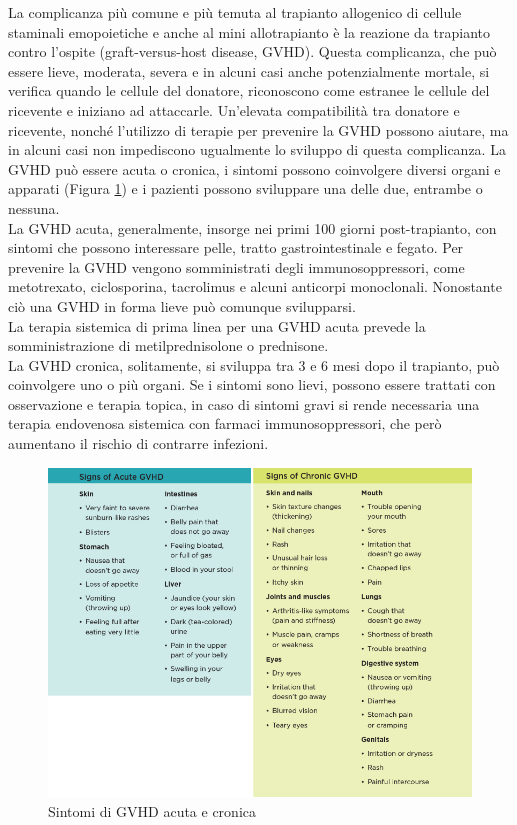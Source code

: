 La complicanza più comune e più temuta al trapianto allogenico di cellule staminali emopoietiche e anche al mini 
allotrapianto è la reazione da trapianto contro l’ospite (graft-versus-host disease, GVHD). Questa complicanza, 
che può essere lieve, moderata, severa e in alcuni casi anche potenzialmente mortale, si verifica quando le cellule 
del donatore, riconoscono come estranee le cellule del ricevente e iniziano ad attaccarle. Un’elevata compatibilità 
tra donatore e ricevente, nonché l’utilizzo di terapie per prevenire la GVHD possono aiutare, ma in alcuni casi non 
impediscono ugualmente lo sviluppo di questa complicanza. 
La GVHD può essere acuta o cronica, i sintomi possono coinvolgere diversi organi e apparati (Figura \ref*{fig:FIGURE_3.17})
e i pazienti possono sviluppare una delle due, entrambe o nessuna\cite{LLSBLOOD}.\\
La GVHD acuta, generalmente, insorge nei primi 100 giorni post-trapianto, con sintomi che possono interessare pelle, 
tratto gastrointestinale e fegato. Per prevenire la GVHD vengono somministrati degli immunosoppressori, come 
metotrexato, ciclosporina, tacrolimus e alcuni anticorpi monoclonali. 
Nonostante ciò una GVHD in forma lieve può comunque svilupparsi\cite{STEMCELLS}.\\
La terapia sistemica di prima linea per una GVHD acuta prevede la somministrazione di metilprednisolone o prednisone\cite{GVHD}.\\
La GVHD cronica, solitamente, si sviluppa tra 3 e 6 mesi dopo il trapianto, può coinvolgere uno o più organi. 
Se i sintomi sono lievi, possono essere trattati con osservazione e terapia topica, in caso di sintomi gravi si rende 
necessaria una terapia endovenosa sistemica con farmaci immunosoppressori, che però aumentano il rischio 
di contrarre infezioni\cite{STEMCELLS}.\\

\begin{figure}[H]
    \begin{center}
    \includegraphics[width=0.9\columnwidth]{img/SignsGVHD.png}
    \vspace{-3mm}
    \end{center}
    \caption{Sintomi di GVHD acuta e cronica
    \cite{img38}}
    \label{fig:FIGURE_3.17}
\end{figure}

